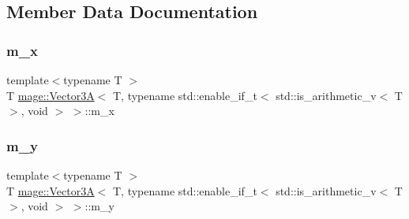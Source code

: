 \subsection{Member Data Documentation}
\hypertarget{structmage_1_1_vector3_a_3_01_t_00_01typename_01std_1_1enable__if__t_3_01std_1_1is__arithmetic__7070ab83646a86866d1e3c9d7eeea37a_a2d814b28ee9cf0bffcb63d7c1a5ee6dd}{}\label{structmage_1_1_vector3_a_3_01_t_00_01typename_01std_1_1enable__if__t_3_01std_1_1is__arithmetic__7070ab83646a86866d1e3c9d7eeea37a_a2d814b28ee9cf0bffcb63d7c1a5ee6dd} 
\subsubsection{\texorpdfstring{m\+\_\+x}{m\_x}}
{\footnotesize\ttfamily template$<$typename T $>$ \\
T \hyperlink{structmage_1_1_vector3_a}{mage\+::\+Vector3A}$<$ T, typename std\+::enable\+\_\+if\+\_\+t$<$ std\+::is\+\_\+arithmetic\+\_\+v$<$ T $>$, void $>$ $>$\+::m\+\_\+x}

\hypertarget{structmage_1_1_vector3_a_3_01_t_00_01typename_01std_1_1enable__if__t_3_01std_1_1is__arithmetic__7070ab83646a86866d1e3c9d7eeea37a_a6bba6c15e9be995048f666bf12d78a06}{}\label{structmage_1_1_vector3_a_3_01_t_00_01typename_01std_1_1enable__if__t_3_01std_1_1is__arithmetic__7070ab83646a86866d1e3c9d7eeea37a_a6bba6c15e9be995048f666bf12d78a06} 
\subsubsection{\texorpdfstring{m\+\_\+y}{m\_y}}
{\footnotesize\ttfamily template$<$typename T $>$ \\
T \hyperlink{structmage_1_1_vector3_a}{mage\+::\+Vector3A}$<$ T, typename std\+::enable\+\_\+if\+\_\+t$<$ std\+::is\+\_\+arithmetic\+\_\+v$<$ T $>$, void $>$ $>$\+::m\+\_\+y}

